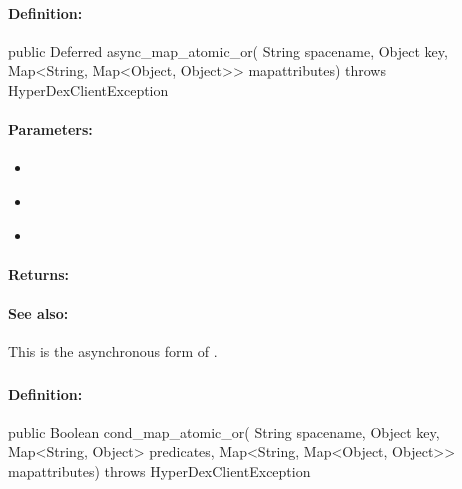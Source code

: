 \paragraph{Definition:}
\begin{javacode}
public Deferred async_map_atomic_or(
        String spacename,
        Object key,
        Map<String, Map<Object, Object>> mapattributes) throws HyperDexClientException
\end{javacode}

\paragraph{Parameters:}
\begin{itemize}[noitemsep]
\item {}\\

\item {}\\

\item {}\\

\end{itemize}

\paragraph{Returns:}


\paragraph{See also:}  This is the asynchronous form of .

\pagebreak
\subsubsection{}
\label{api:java:cond_map_atomic_or}


\paragraph{Definition:}
\begin{javacode}
public Boolean cond_map_atomic_or(
        String spacename,
        Object key,
        Map<String, Object> predicates,
        Map<String, Map<Object, Object>> mapattributes) throws HyperDexClientException
\end{javacode}

